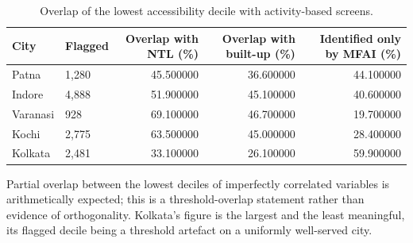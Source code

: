 \begin{table}[htbp]
\centering
\small
\caption{Overlap of the lowest accessibility decile with activity-based screens.}
\label{tab:t13_redundancy}
\begin{tabular}{llrrr}
\toprule
City & Flagged & Overlap with NTL (\%) & Overlap with built-up (\%) & Identified only by MFAI (\%) \\
\midrule
Patna & 1,280 & 45.500000 & 36.600000 & 44.100000 \\
Indore & 4,888 & 51.900000 & 45.100000 & 40.600000 \\
Varanasi & 928 & 69.100000 & 46.700000 & 19.700000 \\
Kochi & 2,775 & 63.500000 & 45.000000 & 28.400000 \\
Kolkata & 2,481 & 33.100000 & 26.100000 & 59.900000 \\
\bottomrule
\end{tabular}
\begin{tablenotes}\footnotesize
\item Partial overlap between the lowest deciles of imperfectly correlated variables is arithmetically expected; this is a threshold-overlap statement rather than evidence of orthogonality. Kolkata's figure is the largest and the least meaningful, its flagged decile being a threshold artefact on a uniformly well-served city.
\end{tablenotes}
\end{table}

